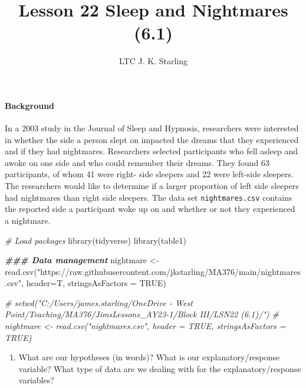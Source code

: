 \documentclass[
]{article}
\title{Lesson 22 Sleep and Nightmares (6.1)}
\author{LTC J. K. Starling}
\date{}
\newenvironment{Shaded}{\begin{snugshade}}{\end{snugshade}}
\newcommand{\AttributeTok}[1]{\textcolor[rgb]{0.77,0.63,0.00}{#1}}
\newcommand{\CommentTok}[1]{\textcolor[rgb]{0.56,0.35,0.01}{\textit{#1}}}
\newcommand{\ConstantTok}[1]{\textcolor[rgb]{0.00,0.00,0.00}{#1}}
\newcommand{\DocumentationTok}[1]{\textcolor[rgb]{0.56,0.35,0.01}{\textbf{\textit{#1}}}}
\newcommand{\FunctionTok}[1]{\textcolor[rgb]{0.00,0.00,0.00}{#1}}
\newcommand{\NormalTok}[1]{#1}
\newcommand{\OtherTok}[1]{\textcolor[rgb]{0.56,0.35,0.01}{#1}}
\newcommand{\StringTok}[1]{\textcolor[rgb]{0.31,0.60,0.02}{#1}}
\providecommand{\tightlist}{%
  \setlength{\itemsep}{0pt}\setlength{\parskip}{0pt}}
\begin{document}
\maketitle

\hypertarget{background}{%
\paragraph{Background}\label{background}}

In a 2003 study in the Journal of Sleep and Hypnosis, researchers were
interested in whether the side a person slept on impacted the dreams
that they experienced and if they had nightmares. Researchers selected
participants who fell asleep and awoke on one side and who could
remember their dreams. They found 63 participants, of whom 41 were
right- side sleepers and 22 were left-side sleepers. The researchers
would like to determine if a larger proportion of left side sleepers had
nightmares than right side sleepers. The data set
\texttt{nightmares.csv} contains the reported side a participant woke up
on and whether or not they experienced a nightmare.

\begin{Shaded}
\begin{Highlighting}[]
\CommentTok{\# Load packages}
\FunctionTok{library}\NormalTok{(tidyverse)}
\FunctionTok{library}\NormalTok{(table1)}
 
\DocumentationTok{\#\#\# Data management}
\NormalTok{nightmare }\OtherTok{\textless{}{-}} \FunctionTok{read.csv}\NormalTok{(}\StringTok{"https://raw.githubusercontent.com/jkstarling/MA376/main/nightmares.csv"}\NormalTok{, }
                      \AttributeTok{header=}\NormalTok{T, }
                      \AttributeTok{stringsAsFactors =} \ConstantTok{TRUE}\NormalTok{)}

\CommentTok{\# setwd("C:/Users/james.starling/OneDrive {-} West Point/Teaching/MA376/JimsLessons\_AY23{-}1/Block III/LSN22 (6.1)/")}
\CommentTok{\# nightmare \textless{}{-} read.csv("nightmares.csv", header = TRUE, stringsAsFactors = TRUE)}
\end{Highlighting}
\end{Shaded}

\begin{enumerate}
\def\labelenumi{(\arabic{enumi})}
\tightlist
\item
  What are our hypotheses (in words)? What is our explanatory/response
  variable? What type of data are we dealing with for the
  explanatory/response variables?
\end{enumerate}
\end{document}
